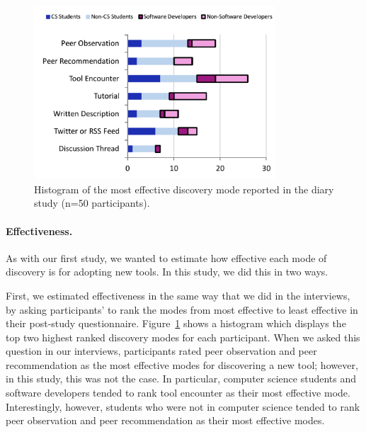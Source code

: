 \documentclass[smallextended]{svjour3}
\newcommand\discpush{peer recommendation\xspace}
\newcommand\discpull{peer observation\xspace}
\begin{document}
 \begin{figure}[t]
 	\centering
 	\begin{center}
 	\includegraphics[width=90mm]{effectiveness}
 	\end{center}
 	\vspace{-5 mm}
 	\caption{Histogram of the most effective discovery mode reported in the diary study (n=50 participants).}\label{fig:effectivemode}
 \end{figure}
 
\paragraph{Effectiveness.}

As with our first study, we wanted to estimate how effective each mode
of discovery is for adopting new tools.
In this study, we did this in two ways.

First, we estimated effectiveness in the same way that 
we did in the interviews, by asking participants' to
rank the modes from most effective to least effective in their
post-study questionnaire.
Figure~\ref{fig:effectivemode} shows a histogram which
displays the top two highest ranked discovery modes for each participant.
When we asked this question in our interviews,
participants rated \discpull and \discpush as 
the most effective modes for discovering a new tool;
however, in this study, this was not the case.
In particular, computer science students and software developers tended 
to rank tool encounter as their most effective mode. 
Interestingly, however, students who were not in computer science tended 
to rank \discpull and \discpush as their most effective modes. 
\end{document}
